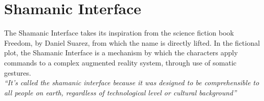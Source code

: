 \section{Shamanic Interface} \label{sec:cul_shaman}
    The Shamanic Interface takes its inspiration from the science fiction book Freedom, by Daniel Suarez, from which the name is directly lifted. In the fictional plot, the Shamanic Interface is a mechanism by which the characters apply commands to a complex augmented reality system, through use of somatic gestures.\\
    
    \emph{“It’s called the shamanic interface because it was designed to be comprehensible to all people on earth, regardless of technological level or cultural background”}\\
    
